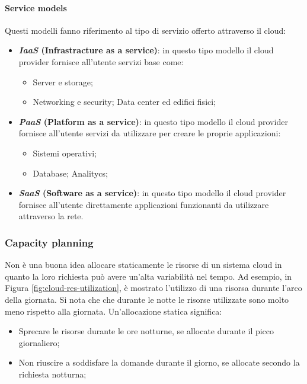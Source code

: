\documentclass{article}
\begin{document}
\paragraph{Service models} Questi modelli fanno riferimento al tipo di servizio offerto 
attraverso il cloud:
\begin{itemize}
  \item \textbf{\textit{IaaS} (Infrastracture as a service)}: in questo tipo modello 
    il cloud provider fornisce all'utente servizi base come: 
    \begin{itemize}
      \item Server e storage;
      \item Networking e security;
      \itemm Data center ed edifici fisici;
    \end{itemize}
  \item \textbf{\textit{PaaS} (Platform as a service)}: in questo tipo modello 
    il cloud provider fornisce all'utente servizi da utilizzare per creare le proprie 
    applicazioni:
    \begin{itemize}
      \item Sistemi operativi;
      \item Database;
      \itemm Analitycs;
    \end{itemize}
  \item \textbf{\textit{SaaS} (Software as a service)}: in questo tipo modello 
    il cloud provider fornisce all'utente direttamente applicazioni funzionanti da utilizzare 
    attraverso la rete.
\end{itemize}

\subsubsection{Capacity planning}
Non è una buona idea allocare staticamente le risorse di un sistema cloud in quanto la loro 
richiesta può avere un'alta variabilità nel tempo. Ad esempio, in Figura 
\ref{fig:cloud-res-utilization}, è mostrato l'utilizzo di una risorsa durante l'arco della 
giornata. Si nota che che durante le notte le risorse utilizzate sono molto meno rispetto 
alla giornata. Un'allocazione statica significa:
\begin{itemize}
  \item Sprecare le risorse durante le ore notturne, se allocate durante il picco giornaliero;
  \item Non riuscire a soddisfare la domande durante il giorno, se allocate secondo la 
    richiesta notturna;
\end{itemize}
\end{document}
